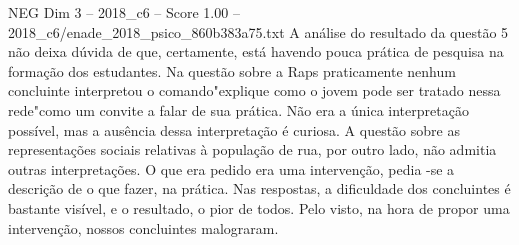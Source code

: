 \begin{textsample}{NEG Dim 3 – 2018\_c6 – Score 1.00 – 2018\_c6/enade\_2018\_psico\_860b383a75.txt}
A análise do resultado da questão 5 não deixa dúvida de que, certamente, está havendo pouca prática de pesquisa na formação dos estudantes.
Na questão sobre a Raps praticamente nenhum concluinte interpretou o comando"explique como o jovem pode ser tratado nessa rede"como um convite a falar de sua prática.
Não era a única interpretação possível, mas a ausência dessa interpretação é curiosa.
A questão sobre as representações sociais relativas à população de rua, por outro lado, não admitia outras interpretações.
O que era pedido era uma intervenção, pedia -se a descrição de o que fazer, na prática.
Nas respostas, a dificuldade dos concluintes é bastante visível, e o resultado, o pior de todos.
Pelo visto, na hora de propor uma intervenção, nossos concluintes malograram.

\end{textsample}
